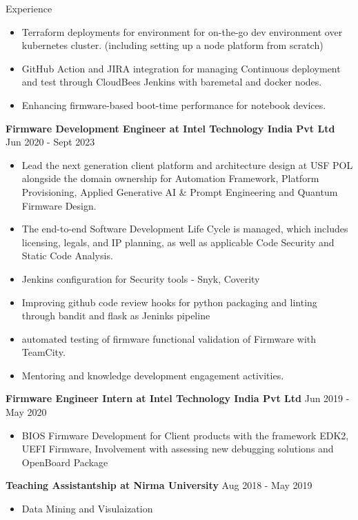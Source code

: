 \documentclass{resume} %
\begin{document}
\begin{rSection}{Experience}
\begin{itemize}
\if{}
    \item Terraform deployments for environment for on-the-go dev environment over kubernetes cluster. (including setting up a node platform from scratch)
\fi
    \item GitHub Action and JIRA integration for managing Continuous deployment and test through CloudBees Jenkins with baremetal and docker nodes.
    \item Enhancing firmware-based boot-time performance for notebook devices.
\end{itemize}
 
{\textbf{Firmware Development Engineer at Intel Technology India Pvt Ltd}}  \hfill {Jun 2020 - Sept 2023}
\begin{itemize}
    \item Lead the next generation client platform and architecture design at USF POL alongside the domain ownership for Automation Framework, Platform Provisioning, Applied Generative AI \& Prompt Engineering and Quantum Firmware Design.
    \item The end-to-end Software Development Life Cycle is managed, which includes licensing, legals, and IP planning, as well as applicable Code Security and Static Code Analysis.
    \item Jenkins configuration for Security tools - Snyk, Coverity
    \item Improving github code review hooks for python packaging and linting through bandit and flask as Jeninks pipeline
    \item automated testing of firmware functional validation of Firmware with TeamCity.
    \item Mentoring and knowledge development engagement activities.
\end{itemize}

{\textbf{Firmware Engineer Intern at Intel Technology India Pvt Ltd}}  \hfill {Jun 2019 - May 2020}
\begin{itemize}
    \item BIOS Firmware Development for Client products with the framework EDK2, UEFI Firmware, Involvement with assessing new debugging solutions and OpenBoard Package
\end{itemize}

{\textbf{Teaching Assistantship at Nirma University}}  \hfill {Aug 2018 - May 2019}
\begin{itemize}
    \item Data Mining and Visulaization
\end{itemize}


\end{rSection}
\end{document}
